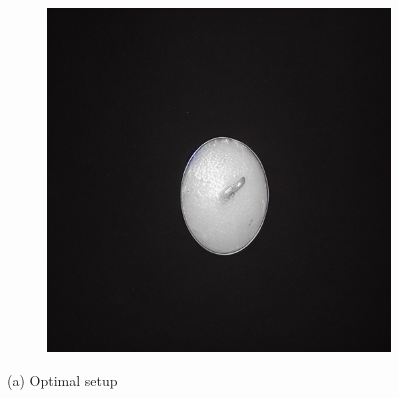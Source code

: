 \documentclass[12pt,DIV14,BCOR12mm,a4paper,footinclude=false,headinclude,parskip=half-,twoside,openright,cleardoublepage=empty,toc=index,bibliography=totoc,listof=totoc]{scrreprt}
\numberwithin{equation}{chapter}
\begin{document}
\begin{figure}
\begin{subfigure}[t]{0.24\textwidth}
        \includegraphics[width=\textwidth]{../media/diff_candles_optimal_fake.png}
    \end{subfigure}
    \caption*{(a) Optimal setup}

    \vspace{0.3cm} %


\end{figure}
\end{document}

